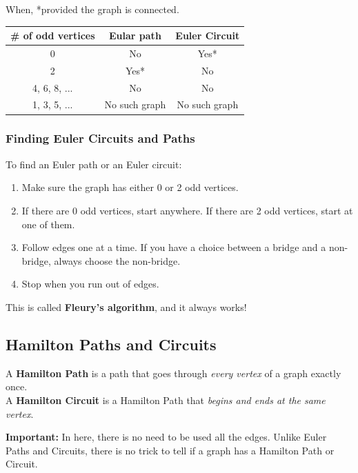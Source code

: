 \documentclass[11pt]{article}
\begin{document}
When, *provided the graph is connected.

\begin{table}[h!]
    \centering
    \begin{tabular}{|c|c|c|}
        \hline
        \# of odd vertices & Eular path & Euler Circuit \\ \hline
        0 & No & Yes* \\ \hline
        2 & Yes* & No \\ \hline
        4, 6, 8, ... & No & No \\ \hline
        1, 3, 5, ... & No such graph & No such graph \\ \hline
    \end{tabular}
\end{table}

\newpage
\subsubsection{Finding Euler Circuits and Paths}

To find an Euler path or an Euler circuit:
\begin{enumerate}
    \item Make sure the graph has either 0 or 2 odd vertices.
    \item If there are 0 odd vertices, start anywhere. If there are 2 odd vertices, start at one of them.
    \item Follow edges one at a time. If you have a choice between a bridge and a non-bridge, always choose the non-bridge.
    \item Stop when you run out of edges.
\end{enumerate}

This is called \textbf{Fleury's algorithm}, and it always works!

\subsection{Hamilton Paths and Circuits}

A \textbf{Hamilton Path} is a path that goes through \textit{every vertex} of a graph exactly once.\\
A \textbf{Hamilton Circuit} is a Hamilton Path that \textit{begins and ends at the same vertex}.

\textbf{Important:} In here, there is no need to be used all the edges. Unlike Euler Paths and Circuits, there is no trick to tell if a graph has a Hamilton Path or Circuit.
\end{document}
